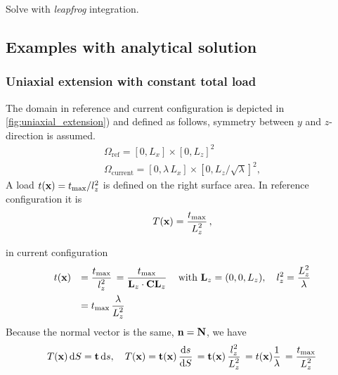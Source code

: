Solve with \emph{leapfrog} integration.

\subsection{Examples with analytical solution}
\subsubsection{Uniaxial extension with constant total load}


The domain in reference and current configuration is depicted in \cref{fig:uniaxial_extension}) and defined as follows, symmetry between $y$ and $z$-direction is assumed.
\begin{equation*}
  \begin{array}{lll}
    \Omega_\text{ref} = [0, L_x] \times [0, L_z]^2\\[4mm]
    \Omega_\text{current} = [0, \lambda\,L_x] \times [0, L_z/\sqrt{\lambda}]^2,
  \end{array}
\end{equation*}
A load $t(\textbf{x}) = t_\text{max}/l_z^2$ is defined on the right surface area. In reference configuration it is
\begin{equation*}
  \begin{array}{lll}
    T(\textbf{x}) = \displaystyle\frac{\displaystyle{t_\text{max}}}{\displaystyle{L_z^2}}\,,\\[4mm]
  \end{array}
\end{equation*}
in current configuration
\begin{equation*}
  \begin{array}{lll}
    t(\textbf{x}) &= \displaystyle\frac{\displaystyle{t_\text{max}}}{\displaystyle{l_z^2}}\, = \displaystyle\frac{\displaystyle{t_\text{max}}}{\displaystyle{\textbf{L}_z \cdot\textbf{C}\textbf{L}_z}}\, \quad \text{with }\textbf{L}_z = (0, 0, L_z), \quad l_z^2 = \displaystyle\frac{\displaystyle{L_z^2}}{\displaystyle{\lambda}}\,\\[4mm]
    &= t_\text{max}\,\displaystyle\frac{\displaystyle{\lambda}}{\displaystyle{L_z^2}}\,
  \end{array}
\end{equation*}
Because the normal vector is the same, $\textbf{n} = \textbf{N}$, we have
\begin{equation*}
  \begin{array}{lll}
    T(\bfx)\,\d S = \bft\,\d s, \quad T(\bfx) = \bft(\bfx)\,\dfrac{\d s}{\d S} = \bft(\bfx)\, \dfrac{l_z^2}{L_z^2} = t(\bfx) \dfrac1{\lambda} = \dfrac{t_\text{max}}{L_z^2}
  \end{array}
\end{equation*}

